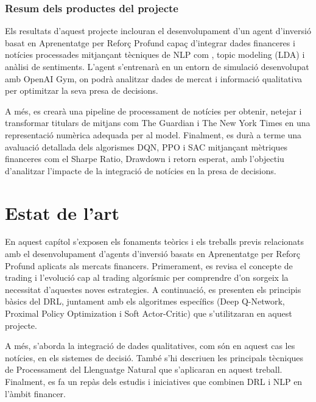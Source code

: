\documentclass[12pt,a4paper,twoside]{book}
\begin{document}
\subsection{Resum dels productes del projecte}

Els resultats d'aquest projecte inclouran el desenvolupament d'un agent d'inversió basat en Aprenentatge per Reforç Profund capaç d'integrar dades financeres i notícies processades mitjançant tècniques de NLP com , topic modeling (LDA) i anàlisi de sentiments. L'agent s'entrenarà en un entorn de simulació desenvolupat amb OpenAI Gym, on podrà analitzar dades de mercat i informació qualitativa per optimitzar la seva presa de decisions.

A més, es crearà una pipeline de processament de notícies per obtenir, netejar i transformar titulars de mitjans com The Guardian i The New York Times en una representació numèrica adequada per al model. Finalment, es durà a terme una avaluació detallada dels algorismes DQN, PPO i SAC mitjançant mètriques financeres com el Sharpe Ratio, Drawdown i retorn esperat, amb l'objectiu d'analitzar l'impacte de la integració de notícies en la presa de decisions.


\chapter{Estat de l'art}

En aquest capítol s'exposen els fonaments teòrics i els treballs previs relacionats amb el desenvolupament d'agents d'inversió basats en Aprenentatge per Reforç Profund aplicats als mercats financers. Primerament, es revisa el concepte de trading i l'evolució cap al trading algorísmic per comprendre d'on sorgeix la necessitat d'aquestes noves estrategies. A continuació, es presenten els principis bàsics del DRL, juntament amb els algoritmes específics (Deep Q-Network, Proximal Policy Optimization i Soft Actor-Critic) que s'utilitzaran en aquest projecte.

A més, s'aborda la integració de dades qualitatives, com són en aquest cas les notícies, en els sistemes de decisió. També s'hi descriuen les principals tècniques de Processament del Llenguatge Natural que s'aplicaran en aquest treball. Finalment, es fa un repàs dels estudis i iniciatives que combinen DRL i NLP en l'àmbit financer.
\end{document}

